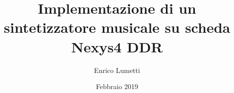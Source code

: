\documentclass[a4paper,12pt]{book}
\begin{document}
\author{Enrico Lumetti}
\title{Implementazione di un sintetizzatore musicale su scheda Nexys4 DDR}
\date{Febbraio 2019}

\frontmatter
\maketitle
\tableofcontents

\mainmatter







\backmatter
\end{document}
